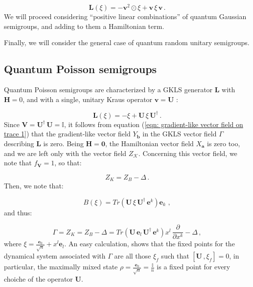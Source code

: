 \documentclass[11pt]{article}
\newcommand{\be}{\begin{equation}}
\newcommand{\ee}{\end{equation}}
\begin{document}
\be
\mathbf{L}(\xi)=-\mathbf{v}^{2}\odot\xi + \mathbf{v}\,\xi\,\mathbf{v}\,.
\ee
We will proceed considering ``positive linear combinations'' of quantum Gaussian semigroups, and adding to them a Hamiltonian term.

Finally, we will consider the general case of quantum random unitary semigroups.


\subsection*{Quantum Poisson semigroups}

Quantum Poisson semigroups are characterized by a GKLS generator $\mathbf{L}$ with $\mathbf{H}=0$, and with a single, unitary Kraus operator $\mathbf{v}=\mathbf{U}$ \cite{lindblad-on_the_generators_of_quantum_dynamical_semigroups, kossakowski-on_quantum_statistical_mechanics_of_non_hamiltonian_systems, aniello_kossakowski_marmo_ventriglia-quantum_brownian_motion_on_lie_groups_and_open_quantum_systems}:

\be
\mathbf{L}(\xi)= - \xi +  \mathbf{U}\,\xi\, \mathbf{U}^{\dagger}\,.
\ee
Since $\mathbf{V}=\mathbf{U}^{\dagger}\,\mathbf{U}=\mathbb{I}$, it follows from equation (\ref{eqn: gradient-like vector field on trace 1}) that the gradient-like vector field $Y_{\mathbf{b}}$ in the GKLS vector field $\Gamma$ describing $\mathbf{L}$ is zero.
Being $\mathbf{H}=\mathbf{0}$, the Hamiltonian vector field $X_{\mathbf{a}}$ is zero too, and we are left only with the vector field $Z_{\mathcal{K}}$.
Concerning this vector field, we note that $f_{\mathbf{V}}=1$, so that:

\be
Z_{K}=Z_{B}  -   \Delta\,.
\ee
Then, we note that:

\be
B(\xi)=Tr\left(\mathbf{U}\,\xi\,\mathbf{U}^{\dagger}\,\mathbf{e}^{k}\right)\mathbf{e}_{k}\, \,,
\ee
and thus:

\be\label{eqn: GKLS vector field for Poisson semigroups}
\Gamma = Z_{K} = Z_{B}  -  \Delta = Tr\left(\mathbf{U}\,\mathbf{e}_{l}\,\mathbf{U}^{\dagger}\,\mathbf{e}^{k}\right)x^{l}\,\frac{\partial}{\partial x^{k}} -  \Delta \,,
\ee
where $\xi=\frac{\mathbf{e}_{0}}{\sqrt{n}} + x^{l}\mathbf{e}_{l}$.
An easy calculation, shows that the fixed points  for the dynamical system associated with $\Gamma$ are all those $\xi_{f}$ such that $[\mathbf{U}\,,\xi_{f}]=0$, in particular,  the maximally mixed state $\rho=\frac{\mathbf{e}_{0}}{\sqrt{n}}=\frac{\mathbb{I}}{n}$ is a fixed point for every choiche of the operator $\mathbf{U}$.
\end{document}
